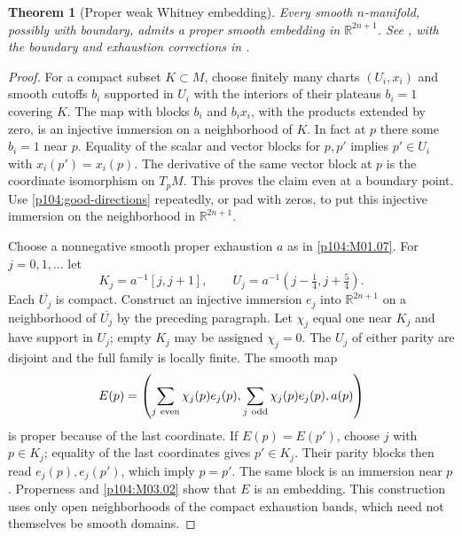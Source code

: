 \documentclass[11pt,oneside,openany]{book}
\newtheorem{theorem}{Theorem}[chapter]
\theoremstyle{definition}
\theoremstyle{remark}
\newcommand{\R}{\mathbb R}
\begin{document}
\begin{theorem}[Proper weak Whitney embedding]\label{p104:M04.02}
Every smooth \(n\)-manifold, possibly with boundary, admits a proper smooth embedding in \(\R^{2n+1}\). See \cite[Lemmas 6.13--6.14 and Theorem 6.15]{lee}, with the boundary and exhaustion corrections in \cite{leeerrata}.
\end{theorem}
\begin{proof}
For a compact subset \(K\subset M\), choose finitely many charts \((U_i,x_i)\) and smooth cutoffs \(b_i\) supported in \(U_i\) with the interiors of their plateaus \(b_i=1\) covering \(K\). The map with blocks \(b_i\) and \(b_ix_i\), with the products extended by zero, is an injective immersion on a neighborhood of \(K\). In fact at \(p\) there some \(b_i=1\) near \(p\). Equality of the scalar and vector blocks for \(p,p'\) implies \(p'\in U_i\) with \(x_i(p')=x_i(p)\). The derivative of the same vector block at \(p\) is the coordinate isomorphism on \(T_pM\). This proves the claim even at a boundary point. Use \cref{p104:good-directions} repeatedly, or pad with zeros, to put this injective immersion on the neighborhood in \(\R^{2n+1}\).

Choose a nonnegative smooth proper exhaustion \(a\) as in \cref{p104:M01.07}. For \(j=0,1,\ldots\) let
\[
 K_j=a^{-1}[j,j+1],
 \qquad U_j=a^{-1}(j-\tfrac14,j+\tfrac54).
\]
Each \(\overline{U_j}\) is compact. Construct an injective immersion \(e_j\) into \(\R^{2n+1}\) on a neighborhood of \(\overline{U_j}\) by the preceding paragraph. Let \(\chi_j\) equal one near \(K_j\) and have support in \(U_j\); empty \(K_j\) may be assigned \(\chi_j=0\). The \(U_j\) of either parity are disjoint and the full family is locally finite. The smooth map
\[
 E(p)=\left(\sum_{j\ {\rm even}}\chi_j(p)e_j(p),
             \sum_{j\ {\rm odd}}\chi_j(p)e_j(p),a(p)\right)
\]
is proper because of the last coordinate. If \(E(p)=E(p')\), choose \(j\) with \(p\in K_j\); equality of the last coordinates gives \(p'\in K_j\). Their parity blocks then read \(e_j(p),e_j(p')\), which imply \(p=p'\). The same block is an immersion near \(p\). Properness and \cref{p104:M03.02} show that \(E\) is an embedding. This construction uses only open neighborhoods of the compact exhaustion bands, which need not themselves be smooth domains.


\end{proof}
\end{document}
